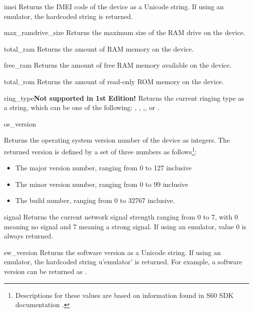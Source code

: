\begin{funcdesc}{imei}{}
Returns the IMEI code of the device as a Unicode string. If using an 
emulator, the hardcoded string  is returned.
\end{funcdesc}

\begin{funcdesc}{max_ramdrive_size}{}
Returns the maximum size of the RAM drive on the device.
\end{funcdesc}

\begin{funcdesc}{total_ram}{}
Returns the amount of RAM memory on the device.
\end{funcdesc}

\begin{funcdesc}{free_ram}{}
Returns the amount of free RAM memory available on the device.
\end{funcdesc}

\begin{funcdesc}{total_rom}{}
Returns the amount of read-only ROM memory on the device.
\end{funcdesc}

\begin{funcdesc}{ring_type}{}\textbf{Not supported in 1st Edition!}
Returns the current ringing type as a string, which can be one of the 
following: , , 
,, or .
\end{funcdesc}

\begin{funcdesc}{os_version}{}

Returns the operating system version number of the device as integers. The 
returned version is defined by a set of three numbers as follows\footnote{ 
Descriptions for these values are based on information found in S60 SDK 
documentation \cite{S60Doc}.}:

\begin{itemize}
\item The major version number, ranging from 0 to 127 inclusive
\item The minor version number, ranging from 0 to 99 inclusive
\item The build number, ranging from 0 to 32767 inclusive.
\end{itemize}
\end{funcdesc}

\begin{funcdesc}{signal}{}
Returns the current network signal strength ranging from 0 to 7, with 0 
meaning no signal and 7 meaning a strong signal. If using an emulator, value 
0 is always returned. 
\end{funcdesc}

\begin{funcdesc}{sw_version}{}
Returns the software version as a Unicode string. If using an emulator, the 
hardcoded string \textsf{u'emulator'} is returned. For example, a software 
version can be returned as .
\end{funcdesc}
